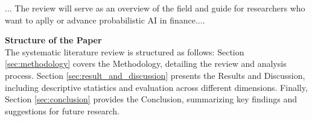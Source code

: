 ... The review will serve as an overview of the field and guide for researchers who want to aplly or advance probabilistic AI in finance.... 


\textbf{Structure of the Paper}\\
The systematic literature review is structured as follows: Section \ref{sec:methodology} covers the Methodology, detailing the review and analysis process. Section \ref{sec:result_and_discussion} presents the Results and Discussion, including descriptive statistics and evaluation across different dimensions. Finally, Section \ref{sec:conclusion} provides the Conclusion, summarizing key findings and suggestions for future research. 